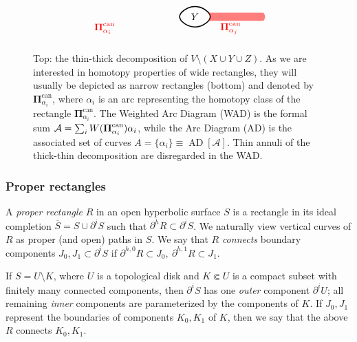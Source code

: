 \documentclass{amsart}
\newcommand{\AD}{{\operatorname{AD}}}
\newcommand{\bPi}{{\boldsymbol \Pi}}
\newcommand{\can}{{\operatorname{can}}}
\newcommand{\1}{{\mathbb 1 }}
\renewcommand{\AA}{{\mathcal A}}
\begin{document}
\begin{figure}[t!]
\[\begin{tikzpicture}
\begin{scope}[shift={(1,-5.5)}]
\draw[,line width=0.4mm,shift={(2,0)}] (2,0)
  .. controls  (2-0.08, 0.1) and (2-0.08,0.2) .. 
(2,0.3)
  .. controls  (2.3, 0.6) and (2.7,0.6) .. 
(3,0.3)
  .. controls  (3.08, 0.2) and (3.08,0.1) .. 
(3,0.)
  .. controls  (2.7, -0.3) and (2.3,-0.3) .. 
(2,0);

\node at (4.5,0.15) {$Y$};


\node[red] at (1.2,-0.28) {$\bPi^\can_{\alpha_i}$};
\node[red] at (5.8,-0.28) {$\bPi^\can_{\alpha_j}$};



\draw[opacity=0, fill=red, fill opacity=0.5]
(5,0.)
  .. controls  (5.08, 0.1) and (5.08,0.2) .. 
(5,0.3)
  .. controls (4,0.3) and (4,0.3) .. 
(7,0.3)
  .. controls  (7.08, 0.2) and (7.08,0.1) .. 
(7,0.);

\end{scope}
\end{tikzpicture}\]

\caption{Top: the thin-thick decomposition of $V\setminus (X\cup Y\cup  Z)$. As we are interested in homotopy properties of wide rectangles, they will usually be depicted
as narrow rectangles (bottom) and denoted by $\bPi^\can_{\alpha_i}$, where $\alpha_i$ is an arc representing the homotopy class of the rectangle $\bPi^\can_{\alpha_i}$. The Weighted Arc Diagram (WAD) is the formal sum $\AA=\sum_i \Weight(\bPi^\can_{\alpha_i})\alpha_i$, while the Arc Diagram (AD) is the associated set of curves $A=\{\alpha_i\}\equiv\AD[\AA]$. Thin annuli of the thick-thin decomposition are disregarded in the WAD.}
\label{Fg:TTD}
\end{figure}



\subsubsection{Proper rectangles} A \emph{proper rectangle} $R$ in an open hyperbolic surface $S$ is a rectangle in its ideal completion $\overline S =S \cup \partial^i S$ such that $\partial^h R\subset \partial^i S$. We naturally view vertical curves of $R$ as proper (and open) paths in $S$. We say that $R$ \emph{connects} boundary components  $J_0, J_1\subset \partial^i S $ if $\partial ^{h,0}R\subset J_0,\  \partial^{h,1}R\subset J_1$.

 If $S=U\setminus K$, where $U$ is a topological disk and $K\Subset U$ is a compact subset with finitely many connected components, then $\partial^i S$ has one \emph{outer} component $\partial^i U $; all remaining \emph{inner} components are parameterized by the components of $K$. If $J_0, J_1$ represent the boundaries of components $K_0, K_1$ of $K$, then we say that the above $R$ connects $K_0,K_1$.
 
\end{document}

